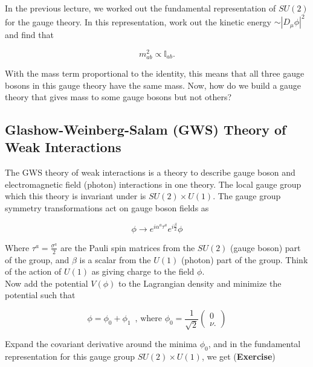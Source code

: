 \documentclass[10pt]{article}
\begin{document}
\noindent In the previous lecture, we worked out the fundamental representation of $SU(2)$ for the gauge theory. In this representation, work out the kinetic energy $\sim |D_\mu \phi|^2$ and find that

\begin{equation}
m_{ab}^2 \propto \mathbb{I}_{ab}.
\end{equation}

\noindent With the mass term proportional to the identity, this means that all three gauge bosons in this gauge theory have the same mass. Now, how do we build a gauge theory that gives mass to some gauge bosons but not others? \\

\subsection*{Glashow-Weinberg-Salam (GWS) Theory of Weak Interactions}

\noindent The GWS theory of weak interactions is a theory to describe gauge boson and electromagnetic field (photon) interactions in one theory. The local gauge group which this theory is invariant under is $SU(2) \times U(1)$. The gauge group symmetry transformations act on gauge boson fields as

\begin{equation}
\phi \rightarrow e^{i \alpha^a \tau^a} e^{i \frac{\beta}{2}} \phi
\end{equation}

\noindent Where $\tau^a = \frac{\sigma^a}{2}$ are the Pauli spin matrices from the $SU(2)$ (gauge boson) part of the group, and $\beta$ is a scalar from the $U(1)$ (photon) part of the group. Think of the action of $U(1)$ as giving charge to the field $\phi$. \\

\noindent Now add the potential $V(\phi)$ to the Lagrangian density and minimize the potential such that

\begin{equation}
\phi = \phi_0 + \phi_1 \, \text{ , where } \phi_0 = \frac{1}{\sqrt{2}} \begin{pmatrix} 0 \\ \nu . \end{pmatrix}
\end{equation}

\noindent Expand the covariant derivative around the minima $\phi_0$, and in the fundamental representation for this gauge group $SU(2) \times U(1)$, we get (\textbf{Exercise})
\end{document}
